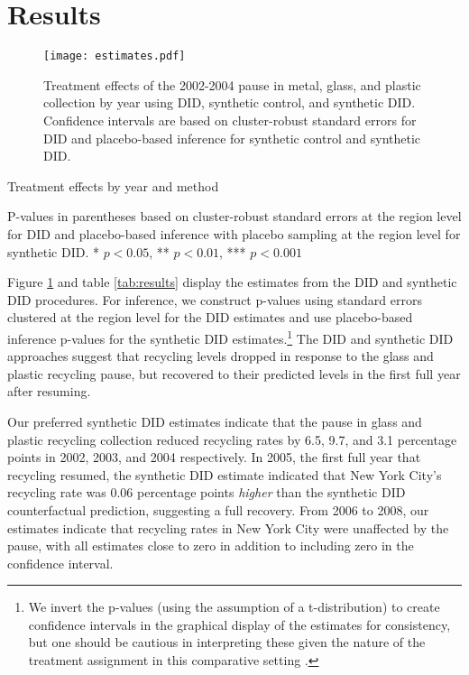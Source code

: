 \documentclass[12pt]{article}
\begin{document}
\section{Results}

\begin{figure}
    \centering
    \texttt{[image: estimates.pdf]}
    \caption{Treatment effects of the 2002-2004 pause in metal, glass, and plastic collection by year using DID, synthetic control, and synthetic DID.  Confidence intervals are based on cluster-robust standard errors for DID and placebo-based inference for synthetic control and synthetic DID.}
    \label{fig:results}
\end{figure}

\begin{table}
    \centering
    \begin{threeparttable}
    \caption{Treatment effects by year and method}
    \label{tab:results}
    
    \begin{tablenotes}[flushleft]
    \scriptsize{P-values in parentheses based on cluster-robust standard errors at the region level for DID and placebo-based inference with placebo sampling at the region level for synthetic DID. * \(p<0.05\), ** \(p<0.01\), *** \(p<0.001\)}
    \end{tablenotes}
    \end{threeparttable}
\end{table}

Figure \ref{fig:results} and table \ref{tab:results} display the estimates from the DID and synthetic DID procedures.  For inference, we construct p-values using standard errors clustered at the region level for the DID estimates and use placebo-based inference p-values for the synthetic DID estimates.\footnote{We invert the p-values (using the assumption of a t-distribution) to create confidence intervals in the graphical display of the estimates for consistency, but one should be cautious in interpreting these given the nature of the treatment assignment in this comparative setting \citep{abadie2015}.}  The DID and synthetic DID approaches suggest that recycling levels dropped in response to the glass and plastic recycling pause, but recovered to their predicted levels in the first full year after resuming.

Our preferred synthetic DID estimates indicate that the pause in glass and plastic recycling collection reduced recycling rates by 6.5, 9.7, and 3.1 percentage points in 2002, 2003, and 2004 respectively.  In 2005, the first full year that recycling resumed, the synthetic DID estimate indicated that New York City's recycling rate was 0.06 percentage points \textit{higher} than the synthetic DID counterfactual prediction, suggesting a full recovery. From 2006 to 2008, our estimates indicate that recycling rates in New York City were unaffected by the pause, with all estimates close to zero in addition to including zero in the confidence interval.
\end{document}
